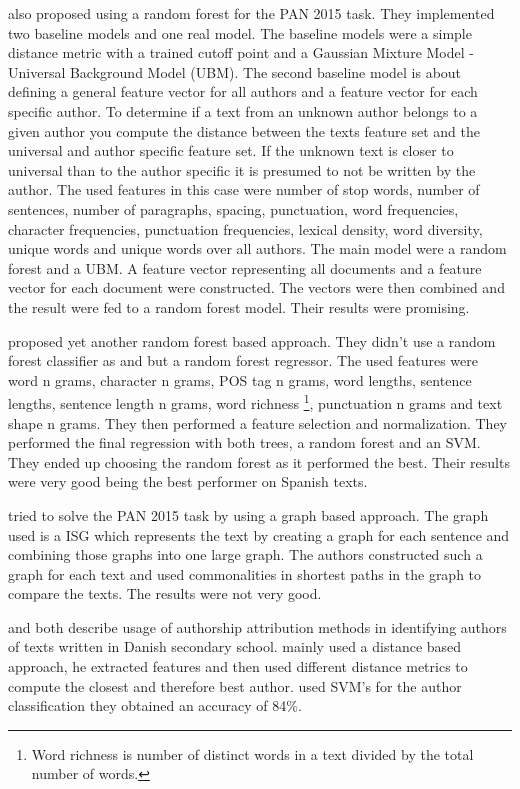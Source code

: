 \cite{pacheco2015} also proposed using a random forest for the PAN 2015 task.
They implemented two baseline models and one real model. The baseline models
were a simple distance metric with a trained cutoff point and a Gaussian Mixture
Model - Universal Background Model (UBM). The second baseline model is about
defining a general feature vector for all authors and a feature vector for
each specific author. To determine if a text from an unknown author belongs
to a given author you compute the distance between the texts feature set and
the universal and author specific feature set. If the unknown text is closer
to universal than to the author specific it is presumed to not be written by
the author. The used features in this case were number of stop words, number
of sentences, number of paragraphs, spacing, punctuation, word frequencies,
character frequencies, punctuation frequencies, lexical density, word diversity,
unique words and unique words over all authors. The main model were a random
forest and a UBM. A feature vector representing all documents and a feature
vector for each document were constructed. The vectors were then combined and
the result were fed to a random forest model. Their results were promising.

\cite{bartoli2015b} proposed yet another random forest based approach.
They didn't use a random forest classifier as \cite{maitra2015} and
\cite{pacheco2015} but a random forest regressor. The used features were word n
grams, character n grams, \gls{POS} tag n grams, word lengths, sentence lengths,
sentence length n grams, word richness \footnote{Word richness is number of
distinct words in a text divided by the total number of words.}, punctuation
n grams and text shape n grams. They then performed a feature selection and
normalization. They performed the final regression with both trees, a random
forest and an SVM. They ended up choosing the random forest as it performed the
best. Their results were very good being the best performer on Spanish texts.



\cite{gomezadorno2015} tried to solve the PAN 2015 task by using a graph based
approach. The graph used is a \gls{ISG} which represents the text by creating a
graph for each sentence and combining those graphs into one large graph. The
authors constructed such a graph for each text and used commonalities in
shortest paths in the graph to compare the texts. The results were not very
good.

\cite{hansen2014} and \cite{aalykke2016} both describe usage of authorship
attribution methods in identifying authors of texts written in Danish secondary
school. \cite{aalykke2016} mainly used a distance based approach, he extracted
features and then used different distance metrics to compute the closest and
therefore best author. \cite{hansen2014} used SVM's for the author
classification they obtained an accuracy of 84\%.

